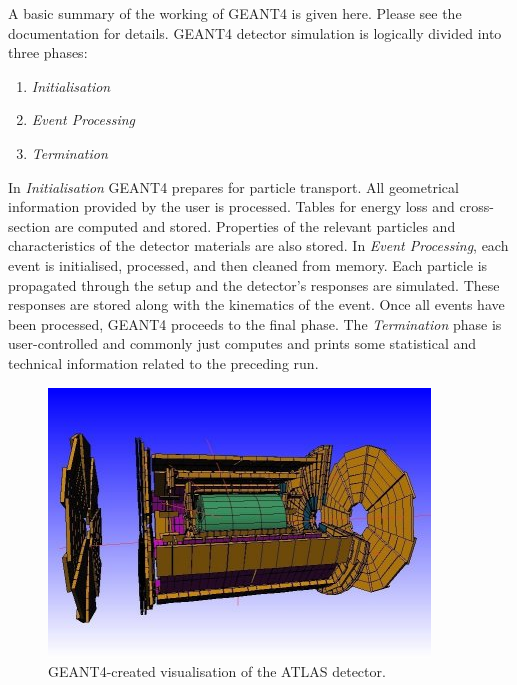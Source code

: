 A basic summary of the working of GEANT4 is given here. Please see the documentation \cite{GEANT} for details. GEANT4 detector simulation is logically divided into three phases:
\begin{enumerate}
\item \textit{Initialisation}
\item \textit{Event Processing}
\item \textit{Termination}
\end{enumerate}
In \textit{Initialisation} GEANT4 prepares for particle transport. All geometrical information provided by the user is processed. Tables for energy loss and cross-section are computed and stored. Properties of the relevant particles and characteristics of the detector materials are also stored. In \textit{Event Processing}, each event is initialised, processed, and then cleaned from memory. Each particle is propagated through the setup and the detector's responses are simulated. These responses are stored along with the kinematics of the event. Once all events have been processed, GEANT4 proceeds to the final phase. The \textit{Termination} phase is user-controlled and commonly just computes and prints some statistical and technical information related to the preceding run.
\begin{figure}
\centering
\includegraphics[scale=0.5]{images/geant_atlas.jpg}
\caption{GEANT4-created visualisation of the ATLAS detector. \cite{geant_atlas}}
\label{event_generator}
\end{figure}
